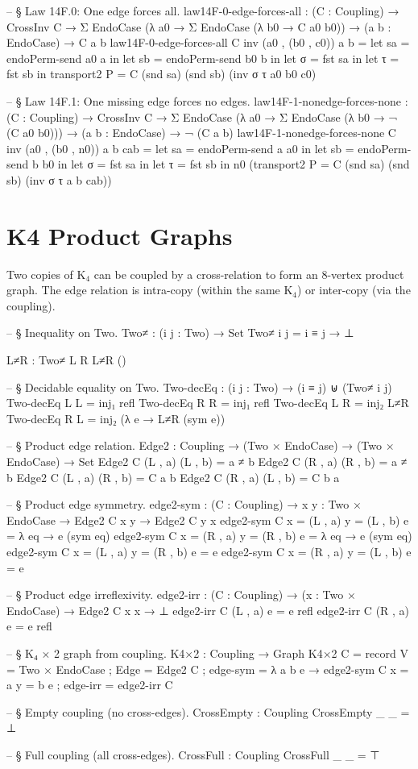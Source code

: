 \documentclass[11pt,a4paper]{book}
\def\texorpdfstring#1#2{#2}%
\begin{document}
\begin{code}
-- § Law 14F.0: One edge forces all.
law14F-0-edge-forces-all : (C : Coupling) → CrossInv C →
  Σ EndoCase (λ a0 → Σ EndoCase (λ b0 → C a0 b0)) →
  (a b : EndoCase) → C a b
law14F-0-edge-forces-all C inv (a0 , (b0 , c0)) a b =
  let sa = endoPerm-send a0 a in
  let sb = endoPerm-send b0 b in
  let σ = fst sa in
  let τ = fst sb in
  transport2 {P = C} (snd sa) (snd sb) (inv σ τ a0 b0 c0)

-- § Law 14F.1: One missing edge forces no edges.
law14F-1-nonedge-forces-none : (C : Coupling) → CrossInv C →
  Σ EndoCase (λ a0 → Σ EndoCase (λ b0 → ¬ (C a0 b0))) →
  (a b : EndoCase) → ¬ (C a b)
law14F-1-nonedge-forces-none C inv (a0 , (b0 , n0)) a b cab =
  let sa = endoPerm-send a a0 in
  let sb = endoPerm-send b b0 in
  let σ = fst sa in
  let τ = fst sb in
  n0 (transport2 {P = C} (snd sa) (snd sb) (inv σ τ a b cab))
\end{code}

\section{K\texorpdfstring{$_4$}{4} Product Graphs}

Two copies of K$_4$ can be coupled by a cross-relation to form an $8$-vertex product
graph. The edge relation is intra-copy (within the same K$_4$) or inter-copy (via the
coupling).

\begin{code}
-- § Inequality on Two.
Two≠ : (i j : Two) → Set
Two≠ i j = i ≡ j → ⊥

L≠R : Two≠ L R
L≠R ()

-- § Decidable equality on Two.
Two-decEq : (i j : Two) → (i ≡ j) ⊎ (Two≠ i j)
Two-decEq L L = inj₁ refl
Two-decEq R R = inj₁ refl
Two-decEq L R = inj₂ L≠R
Two-decEq R L = inj₂ (λ e → L≠R (sym e))

-- § Product edge relation.
Edge2 : Coupling → (Two × EndoCase) → (Two × EndoCase) → Set
Edge2 C (L , a) (L , b) = a ≠ b
Edge2 C (R , a) (R , b) = a ≠ b
Edge2 C (L , a) (R , b) = C a b
Edge2 C (R , a) (L , b) = C b a

-- § Product edge symmetry.
edge2-sym : (C : Coupling) → {x y : Two × EndoCase} → Edge2 C x y → Edge2 C y x
edge2-sym C {x = (L , a)} {y = (L , b)} e = λ eq → e (sym eq)
edge2-sym C {x = (R , a)} {y = (R , b)} e = λ eq → e (sym eq)
edge2-sym C {x = (L , a)} {y = (R , b)} e = e
edge2-sym C {x = (R , a)} {y = (L , b)} e = e

-- § Product edge irreflexivity.
edge2-irr : (C : Coupling) → (x : Two × EndoCase) → Edge2 C x x → ⊥
edge2-irr C (L , a) e = e refl
edge2-irr C (R , a) e = e refl

-- § K₄ × 2 graph from coupling.
K4×2 : Coupling → Graph
K4×2 C = record
  { V = Two × EndoCase
  ; Edge = Edge2 C
  ; edge-sym = λ {a} {b} e → edge2-sym C {x = a} {y = b} e
  ; edge-irr = edge2-irr C
  }

-- § Empty coupling (no cross-edges).
CrossEmpty : Coupling
CrossEmpty _ _ = ⊥

-- § Full coupling (all cross-edges).
CrossFull : Coupling
CrossFull _ _ = ⊤
\end{code}
\end{document}
